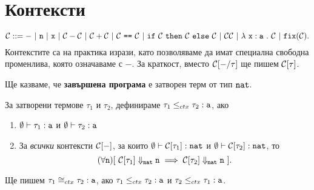 \section{Контексти}\label{pcf:sect:context}

\[\C ::= -\ |\ \vv{n}\ |\ \vv{x}\ |\ \C - \C\ |\ \C + \C\ |\ \C\ \vv{==}\ \C\ |\ \ifelse{\C}{\C}{\C}\ |\ \C\C\ |\ \lamb{x}{a}{\C}\ |\ \fix(\C).\]
Контекстите са на практика изрази, като позволяваме да имат специална свободна променлива, която означаваме с $-$.
За краткост, вместо $\mathcal{C}[-/\tau]$ ще пишем $\mathcal{C}[\tau]$.


Ще казваме, че {\bf завършена програма} е затворен терм от тип $\texttt{nat}$.


\begin{framed}
  \begin{definition}\label{df:context:equivalence}
    За затворени термове $\tau_1$ и $\tau_2$, дефинираме
    $\tau_1 \leq_{ctx} \tau_2 : \texttt{a}$, ако
    \begin{enumerate}[1)]
    \item
      $\emptyset \vdash \tau_1 : \texttt{a}$ и $\emptyset \vdash \tau_2 : \texttt{a}$
    \item
      За \emph{всички} контексти $\mathcal{C}[-]$, за които $\emptyset \vdash \mathcal{C}[\tau_1] : \texttt{nat}$ и $\emptyset \vdash \mathcal{C}[\tau_2] : \texttt{nat}$, то
      \[(\forall \vv{n})[\ \C[\tau_1] \Downarrow_{\nat} \vv{n} \implies \C[\tau_2] \Downarrow_{\nat} \vv{n}\ ].\]
    \end{enumerate}
    Ще пишем $\tau_1 \cong_{ctx} \tau_2 : \texttt{a}$, ако
    $\tau_1 \leq_{ctx} \tau_2 : \texttt{a}$ и $\tau_2 \leq_{ctx} \tau_1 : \texttt{a}$.
  \end{definition}
\end{framed}

